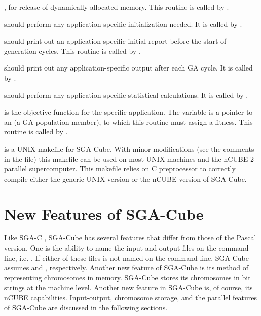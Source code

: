 \begin{description}
\begin{description}
{}, for release of dynamically allocated memory.  
This routine is called by {}.
\item[{\btt{app\_init()}}] should perform any application-specific initialization
needed.  It is called by {}.
\item[{\btt{app\_initreport()}}] should print out an application-specific initial
report before the start of generation cycles.  This routine is 
called by {}.
\item[{\btt{app\_report()}}]  should print out any application-specific  
output 
after each GA cycle.  It is called by {}.
\item[{\btt{app\_stats()}}]  should perform any application-specific statistical
calculations.  It is called by {}.
\item[{\btt{objfunc(critter)}}]  is the objective function for the specific application.
The variable {} is a pointer to an {} 
(a GA population member), to which this routine must assign a fitness.
This routine is called by {}.
\end{description}
\item[{\btt{Makefile}}] is a UNIX makefile for SGA-Cube.  With minor modifications
(see the comments in the file) this makefile can be used on most UNIX machines
and the nCUBE 2 parallel supercomputer.  This makefile relies on C preprocessor
{} to correctly compile either the generic UNIX version or the nCUBE
version of SGA-Cube.
\end{description}

\section{New Features of SGA-Cube}
Like SGA-C \cite{Smith:91}, SGA-Cube has several features that differ from those of the Pascal version.
One is the ability to name the input and output files on the command line, i.e.
{}.  If either of these files is not named on the command line, 
SGA-Cube assumes 
{} and {}, respectively.  
Another new feature of SGA-Cube is its method of representing
chromosomes in memory.
SGA-Cube stores its chromosomes in bit strings at the machine level. 
Another new feature in SGA-Cube is, of course, its nCUBE capabilities.
Input-output, chromosome storage, and the
parallel features of SGA-Cube are discussed in the following sections.


